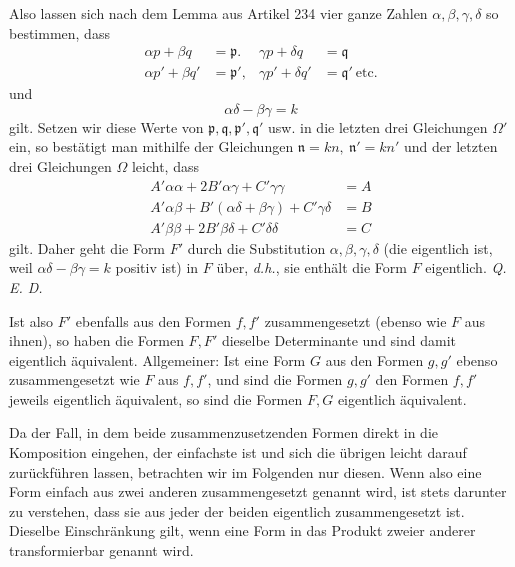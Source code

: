 Also lassen sich nach dem Lemma aus Artikel 234 vier ganze Zahlen $\alpha,\beta,\gamma,\delta$ so bestimmen, dass
\[
\begin{aligned}
\alpha p+\beta q&=\mathfrak{p}.&\gamma p+\delta q&=\mathfrak{q}\\
\alpha p'+\beta q'&=\mathfrak{p}',&\gamma p'+\delta q'&=\mathfrak{q}'\ \text{etc.}
\end{aligned}
\]
und
\[
\alpha\delta-\beta\gamma=k
\]
gilt. Setzen wir diese Werte von $\mathfrak{p},\mathfrak{q},\mathfrak{p}',\mathfrak{q}'$ usw. in die letzten drei Gleichungen $\Omega'$ ein, so bestätigt man mithilfe der Gleichungen $\mathfrak{n}=kn,\ \mathfrak{n}'=kn'$ und der letzten drei Gleichungen $\Omega$ leicht, dass
\[
\begin{aligned}
A'\alpha\alpha+2B'\alpha\gamma+C'\gamma\gamma&=A\\
A'\alpha\beta+B'(\alpha\delta+\beta\gamma)+C'\gamma\delta&=B\\
A'\beta\beta+2B'\beta\delta+C'\delta\delta&=C
\end{aligned}
\]
gilt. Daher geht die Form $F'$ durch die Substitution $\alpha,\beta,\gamma,\delta$ (die eigentlich ist, weil $\alpha\delta-\beta\gamma=k$ positiv ist) in $F$ über, \textit{d.h.}, sie enthält die Form $F$ eigentlich. \textit{Q. E. D.}

Ist also $F'$ ebenfalls aus den Formen $f,f'$ zusammengesetzt (ebenso wie $F$ aus ihnen), so haben die Formen $F,F'$ dieselbe Determinante und sind damit eigentlich äquivalent. Allgemeiner: Ist eine Form $G$ aus den Formen $g,g'$ ebenso zusammengesetzt wie
$F$ aus $f,f'$, und sind die Formen $g,g'$ den Formen $f,f'$ jeweils eigentlich äquivalent, so sind die Formen $F,G$ eigentlich äquivalent.

Da der Fall, in dem beide zusammenzusetzenden Formen direkt in die Komposition eingehen, der einfachste ist und sich die übrigen leicht darauf zurückführen lassen, betrachten wir im Folgenden nur diesen. Wenn also eine Form einfach aus zwei anderen zusammengesetzt genannt wird, ist stets darunter zu verstehen, dass sie aus jeder der beiden eigentlich zusammengesetzt ist. Dieselbe Einschränkung gilt, wenn eine Form in das Produkt zweier anderer transformierbar genannt wird.
